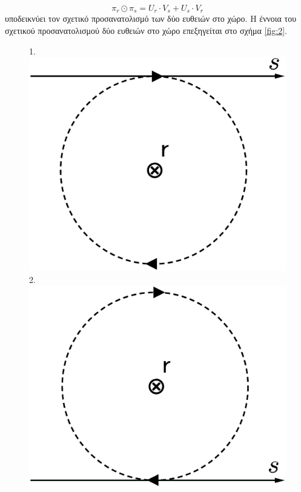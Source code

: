\begin{equation}
\pi_r \odot \pi_s = U_r \cdot V_s + U_s \cdot V_r	
\label{eq:permuted} 
\end{equation}
υποδεικνύει τον σχετικό προσανατολισμό των δύο ευθειών στο χώρο. Η έννοια του σχετικού προσανατολισμού δύο ευθειών στο χώρο επεξηγείται στο σχήμα \ref{fig:2}. 
\begin{figure}[b!]
1.\includegraphics[scale=0.2]{graphics/orientations_cw.eps}
2.\includegraphics[scale=0.2]{graphics/orientations_ccw.eps}

\end{figure}
